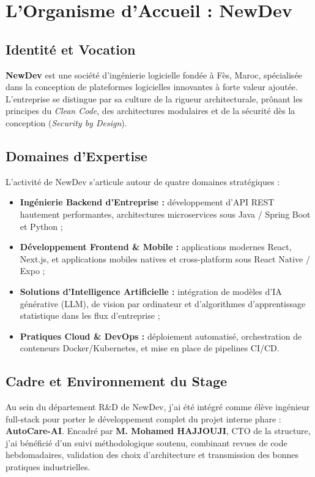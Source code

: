 \documentclass[12pt,a4paper,oneside]{report}
\newcommand{\bpuce}{\textcolor{midBlue}{$\blacktriangleright$}\;}
\begin{document}
\section{L'Organisme d'Accueil : NewDev}

\subsection{Identit\'e et Vocation}
\textbf{NewDev} est une soci\'et\'e d'ing\'enierie logicielle fond\'ee \`a F\`es, Maroc, sp\'ecialis\'ee dans la conception de plateformes logicielles innovantes \`a forte valeur ajout\'ee. L'entreprise se distingue par sa culture de la rigueur architecturale, pr\^onant les principes du \textit{Clean Code}, des architectures modulaires et de la s\'ecurit\'e d\`es la conception (\textit{Security by Design}).

\subsection{Domaines d'Expertise}
L'activit\'e de NewDev s'articule autour de quatre domaines strat\'egiques :
\begin{itemize}[label=\bpuce]
  \item \textbf{Ing\'enierie Backend d'Entreprise :} d\'eveloppement d'API REST hautement performantes, architectures microservices sous Java / Spring Boot et Python ;
  \item \textbf{D\'eveloppement Frontend \& Mobile :} applications modernes React, Next.js, et applications mobiles natives et cross-platform sous React Native / Expo ;
  \item \textbf{Solutions d'Intelligence Artificielle :} int\'egration de mod\`eles d'IA g\'en\'erative (LLM), de vision par ordinateur et d'algorithmes d'apprentissage statistique dans les flux d'entreprise ;
  \item \textbf{Pratiques Cloud \& DevOps :} d\'eploiement automatis\'e, orchestration de conteneurs Docker/Kubernetes, et mise en place de pipelines CI/CD.
\end{itemize}

\subsection{Cadre et Environnement du Stage}
Au sein du d\'epartement R\&D de NewDev, j'ai \'et\'e int\'egr\'e comme \'elève ing\'enieur full-stack pour porter le d\'eveloppement complet du projet interne phare : \textbf{AutoCare-AI}. Encadr\'e par \textbf{M. Mohamed HAJJOUJI}, CTO de la structure, j'ai b\'en\'efici\'e d'un suivi m\'ethodologique soutenu, combinant revues de code hebdomadaires, validation des choix d'architecture et transmission des bonnes pratiques industrielles.
\end{document}
